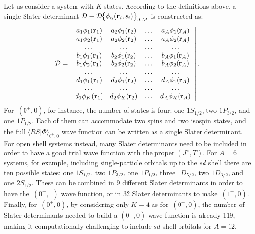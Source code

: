 \documentclass[aps,prc,twocolumn,superscriptaddress,floatfix]{revtex4-1}
\begin{document}
Let us consider a system with $K$ states. According to the definitions above, 
a single Slater determinant $\mathcal D\equiv\mathcal D\big\{\phi_\alpha(\vb{r}_i,s_i)\big\}_{J,M}$ is constructed as:
\begin{align}
\mathcal D=
\left|
\begin{array}{cccc}
a_1\phi_1(\vb{r}_1) & a_2\phi_1(\vb{r}_2) & \dots & a_A\phi_1(\vb{r}_A) \\
a_1\phi_2(\vb{r}_1) & a_2\phi_2(\vb{r}_2) & \dots & a_A\phi_2(\vb{r}_A) \\
\dots & \dots & \dots & \dots \\
b_1\phi_1(\vb{r}_1) & b_2\phi_1(\vb{r}_2) & \dots & b_A\phi_1(\vb{r}_A) \\
b_1\phi_2(\vb{r}_1) & b_2\phi_2(\vb{r}_2) & \dots & b_A\phi_2(\vb{r}_A) \\
\dots & \dots & \dots & \dots \\
d_1\phi_1(\vb{r}_1) & d_2\phi_1(\vb{r}_2) & \dots & d_A\phi_1(\vb{r}_A) \\
\dots & \dots & \dots & \dots \\
d_1\phi_K(\vb{r}_1) & d_2\phi_K(\vb{r}_2) & \dots & d_A\phi_K(\vb{r}_A) \\
\end{array}
\right| . 
\end{align}
For \,$(0^+,0)$, for instance, the number of states is four: 
one $1S_{1/2}$, two $1P_{3/2}$, and one $1P_{1/2}$. Each of them
can accommodate two spins and two isospin states, and the full 
$\langle RS|\Phi\rangle_{0^+,0}$
wave function can be written as a single Slater determinant. 
For open shell systems instead, many Slater determinants need to be 
included in order to have a good trial wave function with the proper $(J^\pi,T)$.
For $A=6$ systems, for example, including single-particle orbitals up to the 
$sd$ shell there are ten possible states: 
one $1S_{1/2}$, two $1P_{3/2}$, one $1P_{1/2}$, three $1D_{5/2}$, 
two $1D_{3/2}$, and one $2S_{1/2}$. These can be combined in 9
different Slater determinants in order to have the \,$(0^+,1)$ wave function, 
or in 32 Slater determinants to make \,$(1^+,0)$. 
Finally, for \,$(0^+,0)$, by considering only $K=4$ as for 
\,$(0^+,0)$, the number of Slater determinants needed to build a $(0^+,0)$ 
wave function is already 119, making it computationally challenging to include $sd$ shell orbitals for $A=12$.
\end{document}
